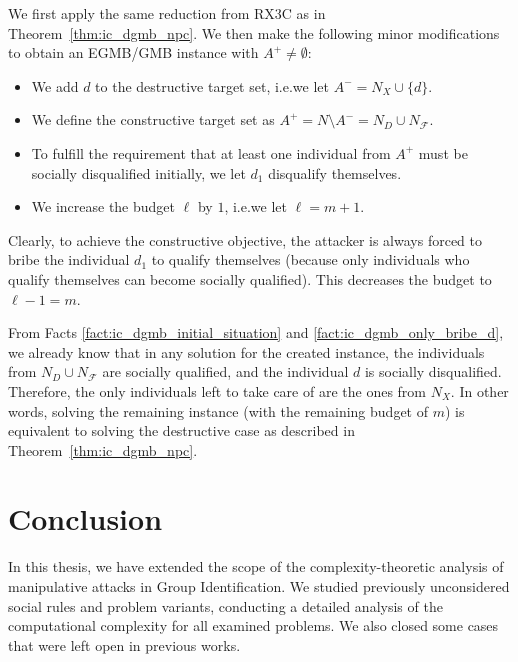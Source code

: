 \documentclass[
    12pt,               %
    a4paper,            %
    bibtotoc,           %
    pointlessnumbers,   %
    ngerman,            %
    titlepage,          %
    leqno,              %
    ]{scrarticle}       %
\newcommand\thmref{Theorem~\ref}
\begin{document}
\begin{Proof}
We first apply the same reduction from RX3C as in \thmref{thm:ic_dgmb_npc}. We then make the following minor modifications to obtain an EGMB/GMB instance with $A^+ \neq \emptyset$:

\begin{itemize}[nolistsep]
\item
We add $d$ to the destructive target set, i.e.\@ we let $A^- = N_X \cup \{d\}$.
\item
We define the constructive target set as $A^+ = N \setminus A^- = N_D \cup N_\mathcal{F}$.
\item
To fulfill the requirement that at least one individual from $A^+$ must be socially disqualified initially, we let $d_1$ disqualify themselves.
\item
We increase the budget $\ell$ by $1$, i.e.\@ we let $\ell = m+1$.
\end{itemize}

Clearly, to achieve the constructive objective, the attacker is always forced to bribe the individual $d_1$ to qualify themselves (because only individuals who qualify themselves can become socially qualified). This decreases the budget to $\ell - 1 = m$.

From Facts \ref{fact:ic_dgmb_initial_situation} and \ref{fact:ic_dgmb_only_bribe_d}, we already know that in any solution for the created instance, the individuals from $N_D \cup N_\mathcal{F}$ are socially qualified, and the individual $d$ is socially disqualified. Therefore, the only individuals left to take care of are the ones from $N_X$. In other words, solving the remaining instance (with the remaining budget of $m$) is equivalent to solving the destructive case as described in \thmref{thm:ic_dgmb_npc}.
\end{Proof}










\clearpage

\section{Conclusion}
\label{sec:conclusion}

In this thesis, we have extended the scope of the complexity-theoretic analysis of manipulative attacks in Group Identification. We studied previously unconsidered social rules and problem variants, conducting a detailed analysis of the computational complexity for all examined problems. We also closed some cases that were left open in previous works.
\end{document}
